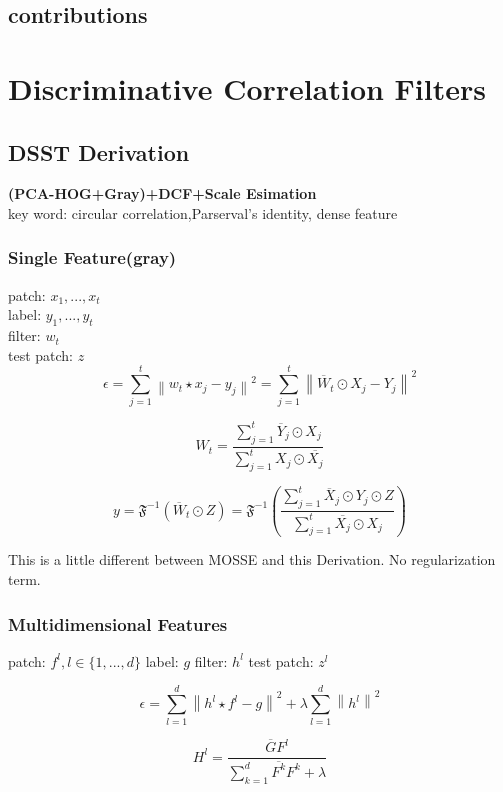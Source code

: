 \documentclass[11pt]{article}
\begin{document}
\subsection{contributions}

\section{Discriminative Correlation Filters}
	\subsection{DSST Derivation}
	\textbf{(PCA-HOG+Gray)+DCF+Scale Esimation}\\
	key word: circular correlation,Parserval's identity, dense feature
		\subsubsection{Single Feature(gray)}
		patch: $x_1,...,x_t$	\\
		label: $y_1,...,y_t$	\\
		filter: $w_t$	\\
		test patch: $z$	\\

$$
\epsilon =  \sum_{j=1}^{t}\left \| w_{t}\star x_{j}-y_{j} \right \|^{2} = \sum_{j=1}^{t}\left \| \overline{W}_{t} \odot X_{j}-Y_{j} \right \|^{2}
$$


$$
W_{t}=\frac{\sum_{j=1}^{t}\overline{Y}_{j} \odot X_{j}}{\sum_{j=1}^{t}X_{j} \odot\overline{ X_{j}}} 
$$

$$
y=\mathfrak{F}^{-1} \left( {\overline{W}_{t} \odot Z}\right)
 = \mathfrak{F}^{-1} \left(\frac{\sum_{j=1}^{t}\overline{X}_{j} \odot Y_{j} \odot Z}{\sum_{j=1}^{t}\overline{X_{j}} \odot X_{j}} \right)
$$

This is a little different between MOSSE\cite{MOSSE} and this Derivation. No regularization term.

\subsubsection{Multidimensional Features}

patch: 
$  f^{l} ,l\in \{ 1,...,d \} $
label: 
$ g $
filter: 
$ h^{l} $
test patch: 
$ z^{l} $

$$
\epsilon =  \sum_{l=1}^{d}\left \| h^{l}\star f^{l}-g \right \|^{2} +\lambda \sum_{l=1}^{d}\left\|h^{l} \right\|^{2}
$$

$$
H^{l}=\frac{\overline{G}F^{l}}{\sum_{k=1}^{d}\overline{F^{k}}F^{k}+\lambda}
$$
\end{document}
